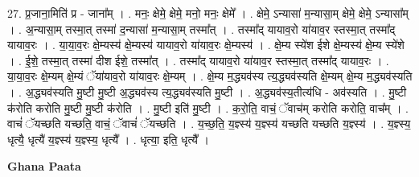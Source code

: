 \documentclass[17pt]{extarticle}
\begin{document}
27. प्र॒जाना॒मिति॑ प्र - जाना᳚म् । . मनः॒ क्षेमे॒ क्षेमे॒ मनो॒ मनः॒ क्षेमे᳚ । . क्षेमे॒ ऽन्यासा॑ म॒न्यासा॒म् क्षेमे॒ क्षेमे॒ ऽन्यासा᳚म् । . अ॒न्यासा॒म् तस्मा॒त् तस्मा॑ द॒न्यासा॑ म॒न्यासा॒म् तस्मा᳚त् । . तस्मा᳚द् यायाव॒रो या॑याव॒र स्तस्मा॒त् तस्मा᳚द् यायाव॒रः । . या॒या॒व॒रः क्षे॒म्यस्य॑ क्षे॒म्यस्य॑ यायाव॒रो या॑याव॒रः क्षे॒म्यस्य॑ । . क्षे॒म्य स्ये॑श ईशे क्षे॒म्यस्य॑ क्षे॒म्य स्ये॑शे । . ई॒शे॒ तस्मा॒त् तस्मा॑ दीश ईशे॒ तस्मा᳚त् । . तस्मा᳚द् यायाव॒रो या॑याव॒र स्तस्मा॒त् तस्मा᳚द् यायाव॒रः । . या॒या॒व॒रः क्षे॒म्यम् क्षे॒म्यं ॅया॑याव॒रो या॑याव॒रः क्षे॒म्यम् । . क्षे॒म्य म॒द्ध्यव॑स्य त्य॒द्ध्यव॑स्यति क्षे॒म्यम् क्षे॒म्य म॒द्ध्यव॑स्यति । . अ॒द्ध्यव॑स्यति मु॒ष्टी मु॒ष्टी अ॒द्ध्यव॑स्य त्य॒द्ध्यव॑स्यति मु॒ष्टी । . अ॒द्ध्यव॑स्य॒तीत्य॑धि - अव॑स्यति । . मु॒ष्टी क॑रोति करोति मु॒ष्टी मु॒ष्टी क॑रोति । . मु॒ष्टी इति॑ मु॒ष्टी । . क॒रो॒ति॒ वाचं॒ ॅवाच॑म् करोति करोति॒ वाच᳚म् । . वाचं॑ ॅयच्छति यच्छति॒ वाचं॒ ॅवाचं॑ ॅयच्छति । . य॒च्छ॒ति॒ य॒ज्ञ्स्य॑ य॒ज्ञ्स्य॑ यच्छति यच्छति य॒ज्ञ्स्य॑ । . य॒ज्ञ्स्य॒ धृत्यै॒ धृत्यै॑ य॒ज्ञ्स्य॑ य॒ज्ञ्स्य॒ धृत्यै᳚ । . धृत्या॒ इति॒ धृत्यै᳚ । \newline

\textbf{Ghana Paata } \newline
\end{document}
